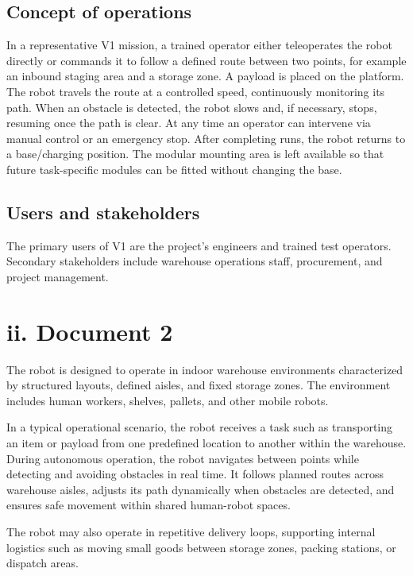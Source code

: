 \subsection*{Concept of operations}

In a representative V1 mission, a trained operator either teleoperates the robot directly or commands it to follow a defined route between two points, for example an inbound staging area and a storage zone. A payload is placed on the platform. The robot travels the route at a controlled speed, continuously monitoring its path. When an obstacle is detected, the robot slows and, if necessary, stops, resuming once the path is clear. At any time an operator can intervene via manual control or an emergency stop. After completing runs, the robot returns to a base/charging position. The modular mounting area is left available so that future task-specific modules can be fitted without changing the base.

\subsection*{Users and stakeholders}

The primary users of V1 are the project's engineers and trained test operators. Secondary stakeholders include warehouse operations staff, procurement, and project management.

\section*{ii. Document 2}

The robot is designed to operate in indoor warehouse environments characterized by structured layouts, defined aisles, and fixed storage zones. The environment includes human workers, shelves, pallets, and other mobile robots.

In a typical operational scenario, the robot receives a task such as transporting an item or payload from one predefined location to another within the warehouse. During autonomous operation, the robot navigates between points while detecting and avoiding obstacles in real time. It follows planned routes across warehouse aisles, adjusts its path dynamically when obstacles are detected, and ensures safe movement within shared human-robot spaces.

The robot may also operate in repetitive delivery loops, supporting internal logistics such as moving small goods between storage zones, packing stations, or dispatch areas.
